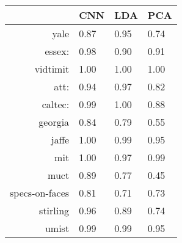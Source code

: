 \begin{tabular}{|r|l|l|l|}
  \hline
    & CNN & LDA & PCA \\
  \hline
  yale & 0.87 & 0.95 & 0.74 \\
  \hline
  essex: & 0.98 & 0.90 & 0.91 \\
  \hline
  vidtimit & 1.00 & 1.00 & 1.00 \\
  \hline
  att: & 0.94 & 0.97 & 0.82 \\
  \hline
  caltec: & 0.99 & 1.00 & 0.88 \\
  \hline
  georgia & 0.84 & 0.79 & 0.55 \\
  \hline
  jaffe & 1.00 & 0.99 & 0.95 \\
  \hline
  mit & 1.00 & 0.97 & 0.99 \\
  \hline
  muct & 0.89 & 0.77 & 0.45 \\
  \hline
  specs-on-faces & 0.81 & 0.71 & 0.73 \\
  \hline
  stirling & 0.96 & 0.89 & 0.74 \\
  \hline
  umist & 0.99 & 0.99 & 0.95 \\
  \hline
\end{tabular}
